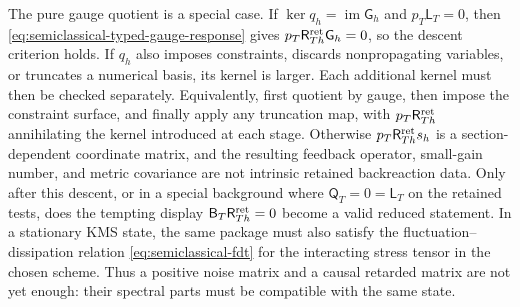 \begin{controlledapproximation}
The pure gauge quotient is a special case.  If
\(\ker q_h=\operatorname{im}\mathsf G_h\) and
\(p_T\mathsf L_T=0\), then
\eqref{eq:semiclassical-typed-gauge-response} gives
\(p_T\mathsf R^{\rm ret}_{Th}\mathsf G_h=0\), so the descent criterion holds.
If \(q_h\) also imposes constraints, discards nonpropagating variables, or
truncates a numerical basis, its kernel is larger.  Each additional kernel
must then be checked separately.  Equivalently, first quotient by gauge,
then impose the constraint surface, and finally apply any truncation map, with
\(p_T\mathsf R^{\rm ret}_{Th}\) annihilating the kernel introduced at each
stage.  Otherwise \(p_T\mathsf R^{\rm ret}_{Th}s_h\) is a
section-dependent coordinate matrix, and the resulting feedback operator,
small-gain number, and metric covariance are not intrinsic retained
backreaction data.  Only after this descent, or in a special background where
\(\mathsf Q_T=0=\mathsf L_T\) on the retained tests, does the tempting display
\(\mathsf B_T\mathsf R^{\rm ret}_{Th}=0\) become a valid reduced statement.  In
a stationary KMS state,
the same package must also satisfy the fluctuation--dissipation relation
\eqref{eq:semiclassical-fdt} for the interacting stress tensor in the chosen
scheme.  Thus a positive noise matrix and a causal retarded matrix are not yet
enough: their spectral parts must be compatible with the same state.


\end{controlledapproximation}
